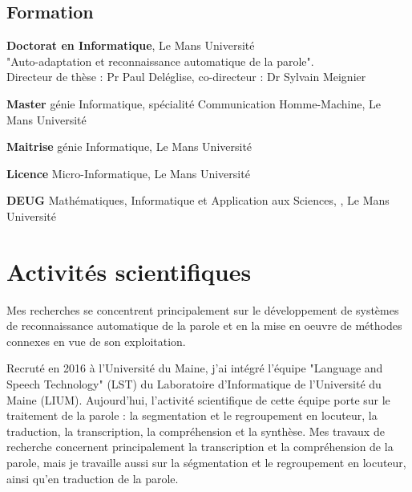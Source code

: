 \documentclass[11pt,a4paper]{article}
\begin{document}
\subsection{Formation}
\begin{description}[noitemsep, align=right, leftmargin=*, font=\normalfont]
\item[2007--2010] {\bf Doctorat en Informatique},  Le Mans Université \\
"Auto-adaptation et reconnaissance automatique de la parole".\\
 Directeur de thèse : Pr Paul Deléglise, co-directeur : Dr Sylvain Meignier
\item[2006] {\bf Master} génie Informatique, spécialité Communication Homme-Machine, Le Mans Université
\item[2005] {\bf Maitrise} génie Informatique, Le Mans Université
\item[2004] {\bf Licence} Micro-Informatique, Le Mans Université
\item[2003] {\bf DEUG} Mathématiques, Informatique et Application aux Sciences, , Le Mans Université
\end{description}

\section{Activités scientifiques}

Mes recherches se concentrent principalement sur le développement de systèmes de reconnaissance automatique de la parole et en la mise en oeuvre de méthodes connexes en vue de son exploitation.

Recruté en 2016 à l'Université du Maine, j'ai intégré l'équipe "Language and Speech Technology" (LST) du Laboratoire d'Informatique de l'Université du Maine (LIUM). Aujourd'hui, l'activité scientifique de cette équipe porte sur le traitement de la parole : la segmentation et le regroupement en locuteur, la traduction, la transcription, la compréhension et la synthèse.
Mes travaux de recherche concernent principalement la transcription et la compréhension de la parole, mais je travaille aussi sur la ségmentation et le regroupement en locuteur, ainsi qu'en traduction de la parole.
\end{document}
